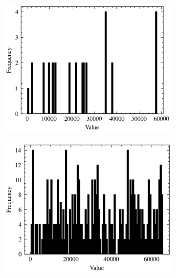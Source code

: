 \begin{figure}
	\centering
	\begin{subfigure}{0.48\linewidth}
		\centering
		\includegraphics[width=\linewidth]{src/figures/lcg-plot/zx/lcg-2-4.png}
	\end{subfigure}
	\begin{subfigure}{0.48\linewidth}
		\centering
		\includegraphics[width=\linewidth]{src/figures/lcg-plot/zx/lcg-2-8.png}
	\end{subfigure}
	\begin{subfigure}{0.48\linewidth}
		\centering

\end{subfigure}
\end{figure}
